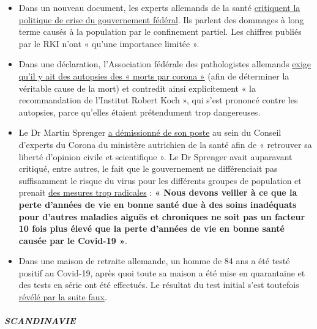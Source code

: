 \begin{itemize}
\tightlist
\item
  Dans un nouveau document, les experts allemands de la santé
  \href{https://www.tagesschau.de/investigativ/ndr-wdr/corona-experten-thesenpapier-101.html}{critiquent
  la politique de crise du gouvernement fédéral}. Ils parlent des
  dommages à long terme causés à la population par le confinement
  partiel. Les chiffres publiés par le RKI n'ont « qu'une importance
  limitée ».
\item
  Dans une déclaration, l'Association fédérale des pathologistes
  allemands
  \href{https://www.pathologie-dgp.de/die-dgp/aktuelles/meldung/pressemitteilung-an-corona-verstorbene-sollten-obduziert-werden/}{exige
  qu'il y ait des autopsies des « morts par corona »} (afin de
  déterminer la véritable cause de la mort) et contredit ainsi
  explicitement « la recommandation de l'Institut Robert Koch », qui
  s'est prononcé contre les autopsies, parce qu'elles étaient
  prétendument trop dangereuses.
\item
  Le Dr Martin Sprenger
  \href{https://mailchi.mp/addendum/fles-home-office-260342}{a
  démissionné de son poste} au sein du Conseil d'experts du Corona du
  ministère autrichien de la santé afin de « retrouver sa liberté
  d'opinion civile et scientifique ». Le Dr Sprenger avait auparavant
  critiqué, entre autres, le fait que le gouvernement ne différenciait
  pas suffisamment le risque du virus pour les différents groupes de
  population et prenait
  \href{https://www.addendum.org/coronavirus/interview-sprenger/}{des
  mesures trop radicales} : \textbf{« Nous devons veiller à ce que la
  perte d'années de vie en bonne santé due à des soins inadéquats pour
  d'autres maladies aiguës et chroniques ne soit pas un facteur 10 fois
  plus élevé que la perte d'années de vie en bonne santé causée par le
  Covid-19 »}.
\item
  Dans une maison de retraite allemande, un homme de 84 ans a été testé
  positif au Covid-19, après quoi toute sa maison a été mise en
  quarantaine et des tests en série ont été effectués. Le résultat du
  test initial s'est toutefois
  \href{https://www.schwerin.de/news/4a3e5560-78c9-11ea-b543-1967de695b51/}{révélé
  par la suite faux}.
\end{itemize}

\hypertarget{scandinavie}{%
\subparagraph{\texorpdfstring{\textbf{SCANDINAVIE}}{SCANDINAVIE}}\label{scandinavie}}

